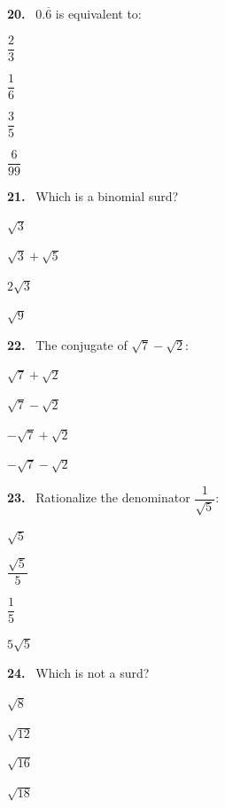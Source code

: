 \documentclass[11pt]{article}
\newenvironment{qenv}[1]{%
  \par\medskip\noindent\textbf{#1.}\ \ignorespaces
}{\par}
\begin{document}
\begin{qenv}{20} $0.\overline{6}$ is equivalent to:
\begin{options} \item $\dfrac{2}{3}$ \item $\dfrac{1}{6}$ \item $\dfrac{3}{5}$ \item $\dfrac{6}{99}$ \end{options} \end{qenv}

\begin{qenv}{21} Which is a binomial surd?
\begin{options} \item $\sqrt{3}$ \item $\sqrt{3}+\sqrt{5}$ \item $2\sqrt{3}$ \item $\sqrt{9}$ \end{options} \end{qenv}

\begin{qenv}{22} The conjugate of $\sqrt{7}-\sqrt{2}$:
\begin{options} \item $\sqrt{7}+\sqrt{2}$ \item $\sqrt{7}-\sqrt{2}$ \item $-\sqrt{7}+\sqrt{2}$ \item $-\sqrt{7}-\sqrt{2}$ \end{options} \end{qenv}

\begin{qenv}{23} Rationalize the denominator $\dfrac{1}{\sqrt{5}}$:
\begin{options} \item $\sqrt{5}$ \item $\dfrac{\sqrt{5}}{5}$ \item $\dfrac{1}{5}$ \item $5\sqrt{5}$ \end{options} \end{qenv}

\begin{qenv}{24} Which is not a surd?
\begin{options} \item $\sqrt{8}$ \item $\sqrt{12}$ \item $\sqrt{16}$ \item $\sqrt{18}$ \end{options} \end{qenv}
\end{document}
